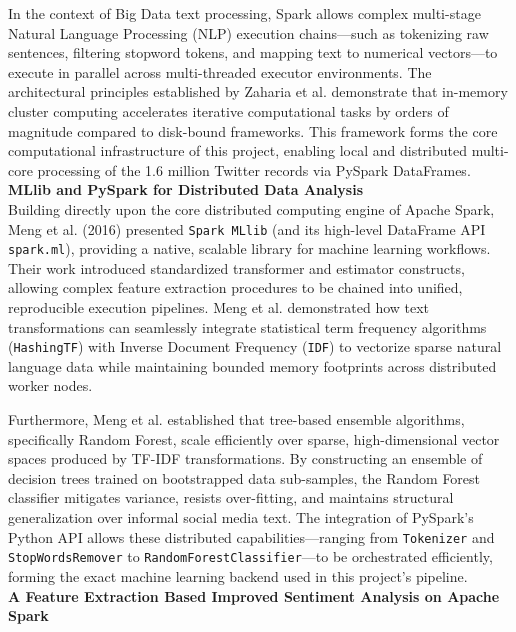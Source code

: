 \documentclass[12pt,a4paper]{article}
\begin{document}
In the context of Big Data text processing, Spark allows complex multi-stage Natural Language Processing (NLP) execution chains---such as tokenizing raw sentences, filtering stopword tokens, and mapping text to numerical vectors---to execute in parallel across multi-threaded executor environments. The architectural principles established by Zaharia et al. demonstrate that in-memory cluster computing accelerates iterative computational tasks by orders of magnitude compared to disk-bound frameworks. This framework forms the core computational infrastructure of this project, enabling local and distributed multi-core processing of the 1.6 million Twitter records via PySpark DataFrames.\\

\textbf{MLlib and PySpark for Distributed Data Analysis}\\

Building directly upon the core distributed computing engine of Apache Spark, Meng et al. (2016) presented \texttt{Spark MLlib} (and its high-level DataFrame API \texttt{spark.ml}), providing a native, scalable library for machine learning workflows. Their work introduced standardized transformer and estimator constructs, allowing complex feature extraction procedures to be chained into unified, reproducible execution pipelines. Meng et al. demonstrated how text transformations can seamlessly integrate statistical term frequency algorithms (\texttt{HashingTF}) with Inverse Document Frequency (\texttt{IDF}) to vectorize sparse natural language data while maintaining bounded memory footprints across distributed worker nodes.

Furthermore, Meng et al. established that tree-based ensemble algorithms, specifically Random Forest, scale efficiently over sparse, high-dimensional vector spaces produced by TF-IDF transformations. By constructing an ensemble of decision trees trained on bootstrapped data sub-samples, the Random Forest classifier mitigates variance, resists over-fitting, and maintains structural generalization over informal social media text. The integration of PySpark's Python API allows these distributed capabilities---ranging from \texttt{Tokenizer} and \texttt{StopWordsRemover} to \texttt{RandomForestClassifier}---to be orchestrated efficiently, forming the exact machine learning backend used in this project's pipeline.\\

\textbf{A Feature Extraction Based Improved Sentiment Analysis on Apache Spark}\\
\end{document}
